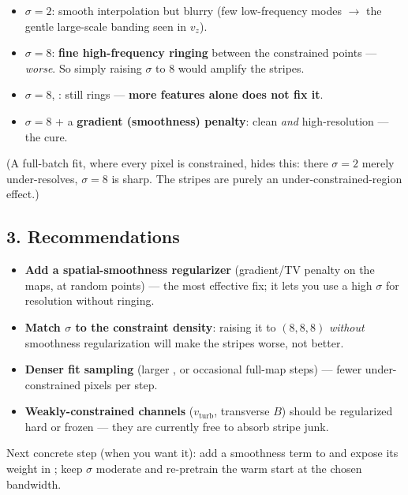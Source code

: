 \begin{itemize}
  \item $\sigma{=}2$: smooth interpolation but blurry (few low-frequency modes $\to$ the gentle large-scale
        banding seen in $v_z$).
  \item $\sigma{=}8$: \textbf{fine high-frequency ringing} between the constrained points --- \emph{worse}.
        So simply raising $\sigma$ to $8$ would amplify the stripes.
  \item $\sigma{=}8$, : still rings --- \textbf{more features alone does not fix it}.
  \item $\sigma{=}8$ + a \textbf{gradient (smoothness) penalty}: clean \emph{and} high-resolution --- the cure.
\end{itemize}
(A full-batch fit, where every pixel is constrained, hides this: there $\sigma{=}2$ merely under-resolves,
$\sigma{=}8$ is sharp. The stripes are purely an under-constrained-region effect.)

\subsection*{3. Recommendations}
\begin{itemize}
  \item \textbf{Add a spatial-smoothness regularizer} (gradient/TV penalty on the maps, at random points) ---
        the most effective fix; it lets you use a high $\sigma$ for resolution without ringing.
  \item \textbf{Match $\sigma$ to the constraint density}: raising it to $(8,8,8)$ \emph{without} smoothness
        regularization will make the stripes worse, not better.
  \item \textbf{Denser fit sampling} (larger , or occasional full-map steps) --- fewer
        under-constrained pixels per step.
  \item \textbf{Weakly-constrained channels} ($v_\mathrm{turb}$, transverse $B$) should be regularized hard
        or frozen --- they are currently free to absorb stripe junk.
\end{itemize}
Next concrete step (when you want it): add a smoothness term to  and expose its weight in
; keep $\sigma$ moderate and re-pretrain the warm start at the chosen bandwidth.


